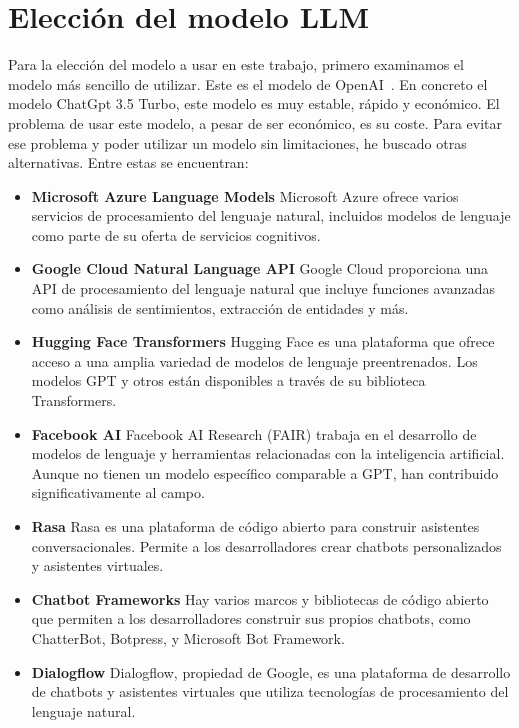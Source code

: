 \section{Elección del modelo LLM}

Para la elección del modelo a usar en este trabajo, primero examinamos el modelo más sencillo de utilizar.
Este es el modelo de OpenAI~\cite{chatgpt1}. En concreto el modelo ChatGpt 3.5 Turbo, este modelo es muy estable, rápido y económico.
El problema de usar este modelo, a pesar de ser económico, es su coste.
Para evitar ese problema y poder utilizar un modelo sin limitaciones, he buscado otras alternativas.
Entre estas se encuentran:
\begin{itemize}
   \item \textbf{Microsoft Azure Language Models} Microsoft Azure ofrece varios servicios de procesamiento del lenguaje natural, incluidos modelos de lenguaje como parte de su oferta de servicios cognitivos.
   \item \textbf{Google Cloud Natural Language API} Google Cloud proporciona una API de procesamiento del lenguaje natural que incluye funciones avanzadas como análisis de sentimientos, extracción de entidades y más.
   \item \textbf{Hugging Face Transformers} Hugging Face es una plataforma que ofrece acceso a una amplia variedad de modelos de lenguaje preentrenados. Los modelos GPT y otros están disponibles a través de su biblioteca Transformers.
   \item \textbf{Facebook AI} Facebook AI Research (FAIR) trabaja en el desarrollo de modelos de lenguaje y herramientas relacionadas con la inteligencia artificial. Aunque no tienen un modelo específico comparable a GPT, han contribuido significativamente al campo.
   \item \textbf{Rasa} Rasa es una plataforma de código abierto para construir asistentes conversacionales. Permite a los desarrolladores crear chatbots personalizados y asistentes virtuales.
   \item \textbf{Chatbot Frameworks} Hay varios marcos y bibliotecas de código abierto que permiten a los desarrolladores construir sus propios chatbots, como ChatterBot, Botpress, y Microsoft Bot Framework.
   \item \textbf{Dialogflow} Dialogflow, propiedad de Google, es una plataforma de desarrollo de chatbots y asistentes virtuales que utiliza tecnologías de procesamiento del lenguaje natural.
\end{itemize}


